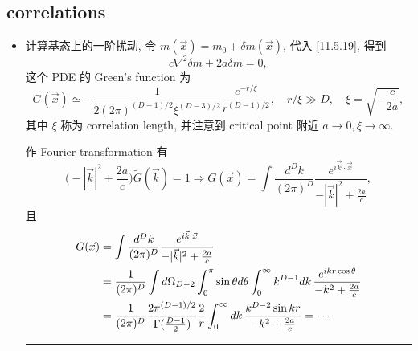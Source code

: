 \subsection{correlations}
\begin{itemize}
	\item 计算基态上的一阶扰动, 令 $m(\vec{x}) = m_0 + \delta m(\vec{x})$, 代入 \eqref{11.5.19}, 得到
	\begin{equation}
		c \nabla^2 \delta m + 2 a \delta m = 0,
	\end{equation}
	这个 PDE 的 Green's function 为
	\begin{equation}
		G(\vec{x}) \simeq - \frac{1}{2 (2 \pi)^{(D - 1) / 2} \xi^{(D - 3) / 2}} \frac{e^{- r / \xi}}{r^{(D - 1) / 2}}, \quad r / \xi \gg D, \quad \xi = \sqrt{- \frac{c}{2 a}},
	\end{equation}
	其中 $\xi$ 称为 correlation length, 并注意到 critical point 附近 $a \rightarrow 0, \xi \rightarrow \infty$.
	
	\begin{tcolorbox}[title=calculation:]
		作 Fourier transformation 有
		\begin{equation}
			\Big( - |\vec{k}|^2 + \frac{2 a}{c} \Big) \tilde{G}(\vec{k}) = 1 \Longrightarrow G(\vec{x}) = \int \frac{d^D k}{(2 \pi)^D} \frac{e^{i \vec{k} \cdot \vec{x}}}{- |\vec{k}|^2 + \frac{2 a}{c}},
		\end{equation}
		且
		\begin{align}
			G(\vec{x}) &= \int \frac{d^D k}{(2 \pi)^D} \frac{e^{i \vec{k} \cdot \vec{x}}}{- |\vec{k}|^2 + \frac{2 a}{c}} \notag \\
			&= \frac{1}{(2 \pi)^D} \int d\Omega_{D - 2} \int_0^\pi \sin \theta d\theta \int_0^\infty k^{D - 1} dk \, \frac{e^{i k r \cos \theta}}{- k^2 + \frac{2 a}{c}} \notag \\
			&= \frac{1}{(2 \pi)^D} \frac{2 \pi^{(D - 1) / 2}}{\Gamma(\frac{D - 1}{2})} \frac{2}{r} \int_0^\infty dk \, \frac{k^{D - 2} \sin k r}{- k^2 + \frac{2 a}{c}} = \cdots
		\end{align}
		
		\noindent\rule[0.5ex]{\linewidth}{0.5pt} %
		

\end{tcolorbox}
\end{itemize}
